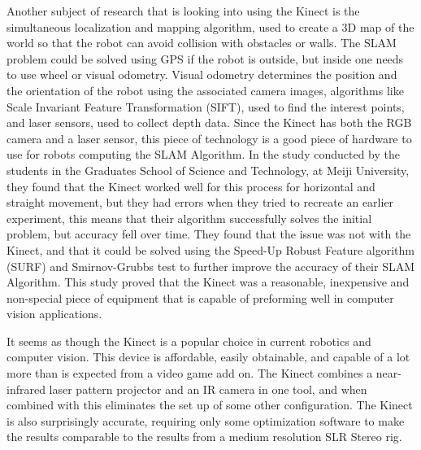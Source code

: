 \documentclass[pdftex,10.5pt]{report}
\begin{document}
Another subject of research that is looking into using the Kinect is the simultaneous localization and mapping algorithm, used to create a 3D map of the world so that the robot can avoid collision with obstacles or walls. The SLAM problem could be solved using GPS if the robot is outside, but inside one needs to use wheel or visual odometry. Visual odometry determines the position and the orientation of the robot using the associated camera images, algorithms like Scale Invariant Feature Transformation (SIFT), used to find the interest points, and laser sensors, used to collect depth data. Since the Kinect has both the RGB camera and a laser sensor, this piece of technology is a good piece of hardware to use for robots computing the SLAM Algorithm. In the study conducted by the students in the Graduates School of Science and Technology, at Meiji University, they found that the Kinect worked well for this process for horizontal and straight movement, but they had errors when they tried to recreate an earlier experiment, this means that their algorithm successfully solves the initial problem, but accuracy fell over time.\cite{cite2} They found that the issue was not with the Kinect, and that it could be solved using the Speed-Up Robust Feature algorithm (SURF) and Smirnov-Grubbs test to further improve the accuracy of their SLAM Algorithm. This study proved that the Kinect was a reasonable, inexpensive and non-special piece of equipment that is capable of preforming well in computer vision applications.

It seems as though the Kinect is a popular choice in current robotics and computer vision. This device is affordable, easily obtainable, and capable of a lot more than is expected from a video game add on. The Kinect combines a near-infrared laser pattern projector and an IR camera in one tool, and when combined with this eliminates the set up of some other configuration. The Kinect is also surprisingly accurate, requiring only some optimization software to make the results comparable to the results from a medium resolution SLR Stereo rig.
\end{document}
